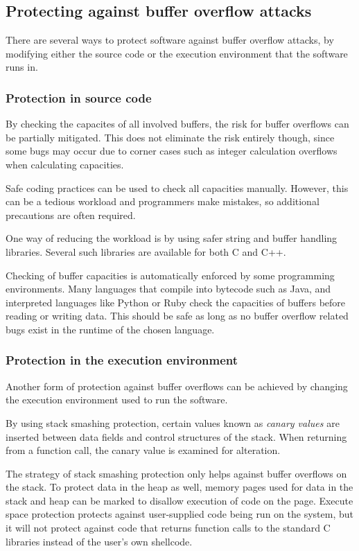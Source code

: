 \subsection{Protecting against buffer overflow attacks}
There are several ways to protect software against buffer overflow attacks,
by modifying either the source code or
the execution environment that the software runs in.

\subsubsection{Protection in source code}
By checking the capacites of all involved buffers,
the risk for buffer overflows can be partially mitigated.
This does not eliminate the risk entirely though,
since some bugs may occur due to corner cases
such as integer calculation overflows when calculating capacities.

Safe coding practices can be used to check all capacities manually.
However, this can be a tedious workload and
programmers make mistakes,
so additional precautions are often required.

One way of reducing the workload is by using
safer string and buffer handling libraries.
Several such libraries are available for both C and C++. 

Checking of buffer capacities is automatically enforced
by some programming environments.
Many languages that compile into bytecode such as Java,
and interpreted languages like Python or Ruby
check the capacities of buffers before reading or writing data.
This should be safe as long as no buffer overflow related bugs exist
in the runtime of the chosen language.

\subsubsection{Protection in the execution environment}
Another form of protection against buffer overflows can be achieved
by changing the execution environment used to run the software.

By using stack smashing protection, certain values known as
\emph{canary values} are inserted between data fields and
control structures of the stack.
When returning from a function call,
the canary value is examined for alteration.

The strategy of stack smashing protection only helps against
buffer overflows on the stack.
To protect data in the heap as well,
memory pages used for data in the stack and heap can be marked to
disallow execution of code on the page.
Execute space protection protects against user-supplied code
being run on the system,
but it will not protect against code that returns function calls to
the standard C libraries instead of the user's own shellcode.

